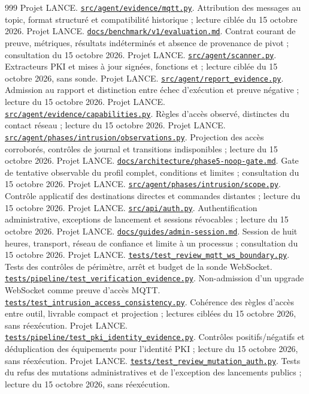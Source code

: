 \documentclass[11pt,a4paper]{article}
\DeclareRobustCommand{\code}[1]{{\small\path{#1}}}
\newcommand{\source}[2]{\href{../../#1}{\nolinkurl{#1}}. #2}
\begin{document}
\begin{thebibliography}{999}
 Projet LANCE. \source{src/agent/evidence/mqtt.py}{Attribution des messages au topic, format structuré et compatibilité historique ; lecture ciblée du 15 octobre 2026.}
 Projet LANCE. \source{docs/benchmark/v1/evaluation.md}{Contrat courant de preuve, métriques, résultats indéterminés et absence de provenance de pivot ; consultation du 15 octobre 2026.}
 Projet LANCE. \source{src/agent/scanner.py}{Extracteurs PKI et mises à jour signées, fonctions \code{_extract_pki_findings} et \code{_extract_ota_findings} ; lecture ciblée du 15 octobre 2026, sans sonde.}
 Projet LANCE. \source{src/agent/report_evidence.py}{Admission au rapport et distinction entre échec d'exécution et preuve négative ; lecture du 15 octobre 2026.}
 Projet LANCE. \source{src/agent/evidence/capabilities.py}{Règles d'accès observé, distinctes du contact réseau ; lecture du 15 octobre 2026.}
 Projet LANCE. \source{src/agent/phases/intrusion/observations.py}{Projection des accès corroborés, contrôles de journal et transitions indisponibles ; lecture du 15 octobre 2026.}
 Projet LANCE. \source{docs/architecture/phase5-noop-gate.md}{Gate de tentative observable du profil complet, conditions et limites ; consultation du 15 octobre 2026.}
 Projet LANCE. \source{src/agent/phases/intrusion/scope.py}{Contrôle applicatif des destinations directes et commandes distantes ; lecture du 15 octobre 2026.}
 Projet LANCE. \source{src/api/auth.py}{Authentification administrative, exceptions de lancement et sessions révocables ; lecture du 15 octobre 2026.}
 Projet LANCE. \source{docs/guides/admin-session.md}{Session de huit heures, transport, réseau de confiance et limite à un processus ; consultation du 15 octobre 2026.}
 Projet LANCE. \source{tests/test_review_mqtt_ws_boundary.py}{Tests des contrôles de périmètre, arrêt et budget de la sonde WebSocket.} \source{tests/pipeline/test_verification_evidence.py}{Non-admission d'un upgrade WebSocket comme preuve d'accès MQTT.} \source{tests/test_intrusion_access_consistency.py}{Cohérence des règles d'accès entre outil, livrable compact et projection ; lectures ciblées du 15 octobre 2026, sans réexécution.}
 Projet LANCE. \source{tests/pipeline/test_pki_identity_evidence.py}{Contrôles positifs/négatifs et déduplication des équipements pour l'identité PKI ; lecture du 15 octobre 2026, sans réexécution.}
 Projet LANCE. \source{tests/test_review_mutation_auth.py}{Tests du refus des mutations administratives et de l'exception des lancements publics ; lecture du 15 octobre 2026, sans réexécution.}

\end{thebibliography}
\end{document}
